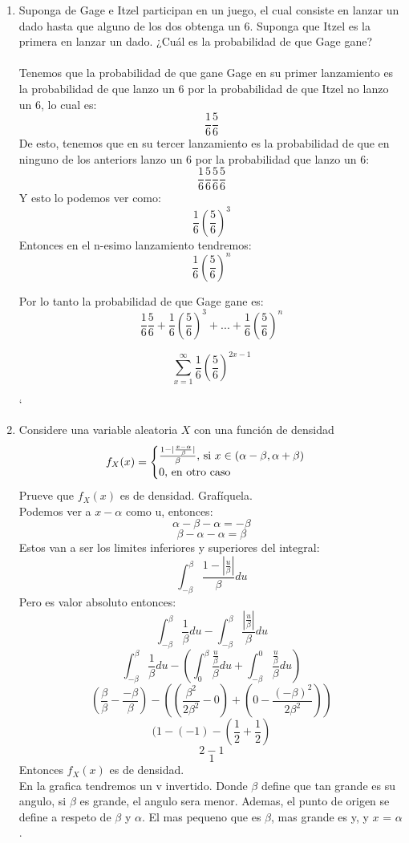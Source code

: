 \documentclass[12pt,a4paper]{report}
\begin{document}
	\begin{enumerate}
		\item{
			Suponga de Gage e Itzel participan en un juego, el cual consiste en
			lanzar un dado hasta que alguno de los dos obtenga un 6. Suponga
			que Itzel es la primera en lanzar un dado. ¿Cuál es la probabilidad
			de que Gage gane?
			\\ \\
	        Tenemos que la probabilidad de que gane Gage en su primer lanzamiento es la 
		probabilidad de que lanzo un 6 por la probabilidad de que Itzel no lanzo un 
		6, lo cual es:
	        \[\frac{1}{6}\frac{5}{6}\]
	        De esto, tenemos que en su tercer lanzamiento es la probabilidad de que en 
		ninguno de los anteriors lanzo un 	6 por la probabilidad que lanzo  un 6:		
	        \[\frac{1}{6}\frac{5}{6}\frac{5}{6}\frac{5}{6}\]
	        Y esto lo podemos ver como:
	        \[\frac{1}{6}(\frac{5}{6})^{3}\]
	        Entonces en el n-esimo lanzamiento tendremos:
	        \[\frac{1}{6}(\frac{5}{6})^{n}\]
	        
	        Por lo tanto la probabilidad de que Gage gane es:
	        \[\frac{1}{6}\frac{5}{6} + \frac{1}{6}(\frac{5}{6})^{3} + ... + \frac{1}{6}(\frac{5}{6})^{n}\]
	        
	        \[\sum^{\infty}_{x=1} \frac{1}{6}(\frac{5}{6})^{2x - 1}\]
	        
	        
	       `
			
		}
		\item{
			Considere una variable aleatoria $X$ con una función de densidad
			\[
				f_X(x) = \begin{cases}
					\frac{1-|\frac{x-\alpha}{\beta}|}{\beta},
					$ si $ x \in (\alpha - \beta, \alpha + \beta)\\
					0, $ en otro caso$
				\end{cases}
			\]
			Prueve que $f_X(x)$ es de densidad. Grafíquela.\\
			
			Podemos ver a $x - \alpha$ como u, entonces:
			\[\alpha - \beta - \alpha = -\beta\]
			\[\beta - \alpha - \alpha = \beta\]
			Estos van a ser los limites inferiores y superiores del integral:
    			\[\int^\beta_{-\beta}  \frac{1-|\frac{u}{\beta}|}{\beta}du\]
			Pero es valor absoluto entonces:
			\[\int^\beta_{-\beta} \frac{1}{\beta}du - \int^\beta_{-\beta} \frac{|\frac{u}{\beta}|}{\beta}du\]
			\[\int^\beta_{-\beta} \frac{1}{\beta}du -( \int^\beta_{0} \frac{\frac{u}{\beta}}{\beta}du + 				\int^0_{-\beta}  \frac{\frac{u}{\beta}}{\beta}du)\]
			\[(\frac{\beta}{\beta}-\frac{-\beta}{\beta}) - ((\frac{\beta^2}{2\beta^2} - 0) 
			+ (0 - \frac{(-\beta)^2}{2\beta^2}))\]
			\[(1-(-1) - (\frac{1}{2} + \frac{1}{2})\]
			\[2-1\]
			\[1\]
			Entonces $f_X(x)$ es de densidad.\\
			En la grafica tendremos un v invertido. Donde $\beta$ define que tan grande es su angulo, 
			si $\beta$ es grande, el angulo sera menor. Ademas, el punto de origen se define a 
			respeto de $\beta$ y $\alpha$. El mas pequeno que es $\beta$, mas grande es y, y $x$ 
			= $\alpha$.
		}


\end{enumerate}
\end{document}
